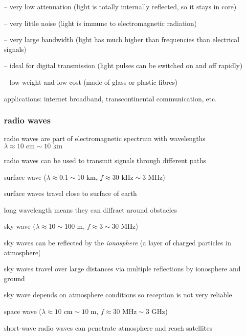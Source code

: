 \begin{compactitem}
	\item[--] very low attenuation (light is totally internally reflected, so it stays in core)
	
	\item[--] very little noise (light is immune to electromagnetic radiation)
	
	\item[--] very large bandwidth (light has much higher than frequencies than electrical signals)
	
	\item[--] ideal for digital transmission (light pulses can be switched on and off rapidly)
	
	\item[--] low weight and low cost (made of glass or plastic fibres)
\end{compactitem}

\cmt applications: internet broadband, transcontinental communication, etc.

\subsubsection{radio waves}

radio waves are part of electromagnetic spectrum with wavelengths $\lambda \approx 10\text{ cm} \sim 10 \text{ km}$

radio waves can be used to transmit signals through different paths

\cmt surface wave ($\lambda \approx 0.1 \sim 10 \text{ km}$, $f\approx 30 \text{ kHz} \sim 3 \text{ MHz}$)

surface waves travel close to surface of earth

long wavelength means they can diffract around obstacles

\cmt sky wave ($\lambda \approx 10 \sim 100 \text{ m}$, $f\approx 3 \sim 30 \text{ MHz}$)

sky waves can be reflected by the \emph{ionosphere} (a layer of charged particles in atmosphere)

sky waves travel over large distances via multiple reflections by ionosphere and ground

sky wave depends on atmosphere conditions so reception is not very reliable

\cmt space wave ($\lambda \approx 10\text{ cm} \sim 10 \text{ m}$, $f\approx 30 \text{ MHz} \sim 3 \text{ GHz} $)

short-wave radio waves can penetrate atmosphere and reach satellites

